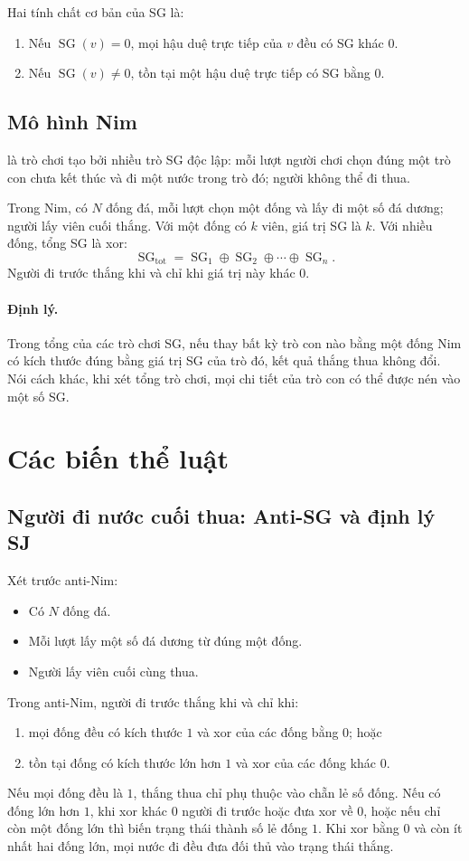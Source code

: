\documentclass[11pt]{article}
\newcommand{\SG}{\operatorname{SG}}
\newcommand{\xor}{\mathbin{\oplus}}
\begin{document}
Hai tính chất cơ bản của SG là:
\begin{enumerate}
  \item Nếu \(\SG(v)=0\), mọi hậu duệ trực tiếp của \(v\) đều có SG khác \(0\).
  \item Nếu \(\SG(v)\ne 0\), tồn tại một hậu duệ trực tiếp có SG bằng \(0\).
\end{enumerate}

\subsection{Mô hình Nim}

 là trò chơi tạo bởi nhiều trò SG độc lập: mỗi
lượt người chơi chọn đúng một trò con chưa kết thúc và đi một nước trong trò
đó; người không thể đi thua.

Trong Nim, có \(N\) đống đá, mỗi lượt chọn một đống và lấy đi một số đá dương;
người lấy viên cuối thắng. Với một đống có \(k\) viên, giá trị SG là \(k\).
Với nhiều đống, tổng SG là xor:
\[
  \SG_{\mathrm{tot}}=\SG_1\xor\SG_2\xor\cdots\xor\SG_n.
\]
Người đi trước thắng khi và chỉ khi giá trị này khác \(0\).

\paragraph{Định lý.}
Trong tổng của các trò chơi SG, nếu thay bất kỳ trò con nào bằng một đống Nim
có kích thước đúng bằng giá trị SG của trò đó, kết quả thắng thua không đổi.
Nói cách khác, khi xét tổng trò chơi, mọi chi tiết của trò con có thể được
nén vào một số SG.

\section{Các biến thể luật}

\subsection{Người đi nước cuối thua: Anti-SG và định lý SJ}

Xét trước anti-Nim:
\begin{itemize}
  \item Có \(N\) đống đá.
  \item Mỗi lượt lấy một số đá dương từ đúng một đống.
  \item Người lấy viên cuối cùng thua.
\end{itemize}

Trong anti-Nim, người đi trước thắng khi và chỉ khi:
\begin{enumerate}
  \item mọi đống đều có kích thước \(1\) và xor của các đống bằng \(0\); hoặc
  \item tồn tại đống có kích thước lớn hơn \(1\) và xor của các đống khác \(0\).
\end{enumerate}
Nếu mọi đống đều là \(1\), thắng thua chỉ phụ thuộc vào chẵn lẻ số đống. Nếu
có đống lớn hơn \(1\), khi xor khác \(0\) người đi trước hoặc đưa xor về \(0\),
hoặc nếu chỉ còn một đống lớn thì biến trạng thái thành số lẻ đống \(1\).
Khi xor bằng \(0\) và còn ít nhất hai đống lớn, mọi nước đi đều đưa đối thủ
vào trạng thái thắng.
\end{document}

